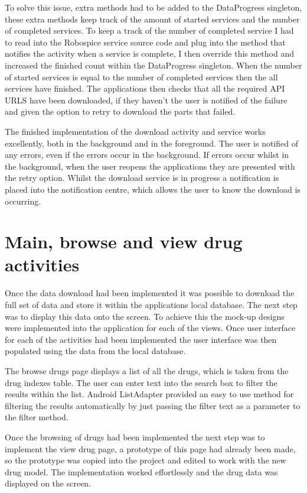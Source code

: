To solve this issue, extra methods had to be added to the DataProgress singleton, these extra methods keep track of the amount of started services and the number of completed services. To keep a track of the number of completed service I had to read into the Robospice service source code \cite{robospice} and plug into the method that notifies the activity when a service is complete, I then override this method and increased the finished count within the DataProgress singleton. When the number of started services is equal to the number of completed services then the all services have finished. The applications then checks that all the required API URLS have been downloaded, if they haven’t the user is notified of the failure and given the option to retry to download the parts that failed. 

The finished implementation of the download activity and service works excellently, both in the background and in the foreground. The user is notified of any errors, even if the errors occur in the background. If errors occur whilst in the background, when the user reopens the applications they are presented with the retry option. Whilst the download service is in progress a notification is placed into the notification centre, which allows the user to know the download is occurring.


\section{Main, browse and view drug activities}

Once the data download had been implemented it was possible to download the full set of data and store it within the applications local database. The next step was to display this data onto the screen. To achieve this the mock-up designs were implemented into the application for each of the views. Once user interface for each of the activities had been implemented the user interface was then populated using the data from the local database. 

The browse drugs page displays a list of all the drugs, which is taken from the drug indexes table. The user can enter text into the search box to filter the results within the list. Android ListAdapter provided an easy to use method for filtering the results automatically by just passing the filter text as a parameter to the filter method. 

Once the browsing of drugs had been implemented the next step was to implement the view drug page, a prototype of this page had already been made, so the prototype was copied into the project and edited to work with the new drug model. The implementation worked effortlessly and the drug data was displayed on the screen. 

